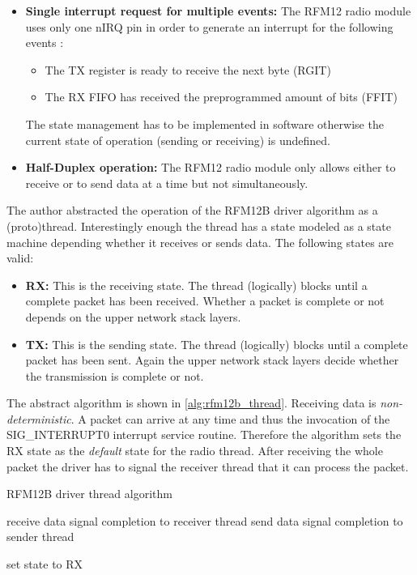 \begin{itemize}
    \item \textbf{Single interrupt request for multiple events:} The RFM12 radio module uses only one nIRQ pin in order to generate an interrupt for the following events \cite{sis4221_datasheet}:
\begin{itemize}
    \item The TX register is ready to receive the next byte (RGIT)
    \item The RX FIFO has received the preprogrammed amount of bits (FFIT)
\end{itemize}
The state management has to be implemented in software otherwise the current state of operation (sending or receiving) is undefined.
    \item \textbf{Half-Duplex operation:} The RFM12 radio module only allows either to receive or to send data at a time but not simultaneously.
\end{itemize}

The author abstracted the operation of the RFM12B driver algorithm as a (proto)thread. Interestingly enough the thread has a state modeled as a state machine depending whether it receives or sends data. The following states are valid:

\begin{itemize}
    \item \textbf{RX:} This is the receiving state. The thread (logically) blocks until a complete packet has been received. Whether a packet is complete or not depends on the upper network stack layers.
    \item \textbf{TX:} This is the sending state. The thread (logically) blocks until a complete packet has been sent. Again the upper network stack layers decide whether the transmission is complete or not.
\end{itemize}

The abstract algorithm is shown in \ref{alg:rfm12b_thread}. Receiving data is \emph{non-deterministic}. A packet can arrive at any time and thus the invocation of the SIG\_INTERRUPT0 interrupt service routine. Therefore the algorithm sets the RX state as the \emph{default} state for the radio thread. After receiving the whole packet the driver has to signal the receiver thread that it can process the packet.

\begin{algorithm}[H]
\caption{RFM12B driver thread algorithm}
\label{alg:rfm12b_thread}
\begin{algorithmic}
        \STATE receive data
        \STATE signal completion to receiver thread
        \STATE send data
        \STATE signal completion to sender thread
    \ENDIF

    \STATE set state to RX
\ENDWHILE
\end{algorithmic}
\end{algorithm}

